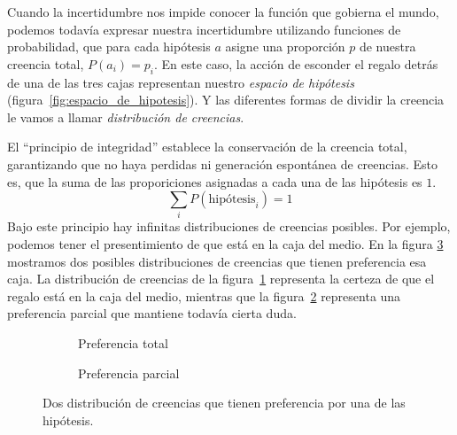 \documentclass[a4paper,10pt]{book}
\theoremstyle{definition}
\begin{document}
%
Cuando la incertidumbre nos impide conocer la función que gobierna el mundo, podemos todavía expresar nuestra incertidumbre utilizando funciones de probabilidad, que para cada hipótesis $a$ asigne una proporción $p$ de nuestra creencia total, $P(a_i) = p_i$.
%
En este caso, la acción de esconder el regalo detrás de una de las tres cajas representan nuestro \emph{espacio de hipótesis} (figura~\ref{fig:espacio_de_hipotesis}).
%
Y las diferentes formas de dividir la creencia le vamos a llamar \emph{distribución de creencias}.


El ``principio de integridad'' establece la conservación de la creencia total, garantizando que no haya perdidas ni generación espontánea de creencias.
%
Esto es, que la suma de las proporiciones asignadas a cada una de las hipótesis es $1$.
%
\begin{equation}
\sum_{i} P(\text{hipótesis}_i) = 1
\end{equation}
%
Bajo este principio hay infinitas distribuciones de creencias posibles.
%
Por ejemplo, podemos tener el presentimiento de que está en la caja del medio.
%
En la figura \ref{fig:distribucion_de_creencias} mostramos dos posibles distribuciones de creencias que tienen preferencia esa caja.
%
La distribución de creencias de la figura~\ref{fig:preferencia_total} representa la certeza de que el regalo está en la caja del medio, mientras que la figura~\ref{fig:preferencia_parcial} representa una preferencia parcial que mantiene todavía cierta duda.


\begin{figure}[ht!]     
 \centering
 \begin{subfigure}[b]{0.48\textwidth}
 \centering
    \caption{Preferencia total}
    \label{fig:preferencia_total}
 \end{subfigure}
 \begin{subfigure}[b]{0.48\textwidth}
 \centering
    \caption{Preferencia parcial}
    \label{fig:preferencia_parcial}
 \end{subfigure}
\caption{Dos distribución de creencias que tienen preferencia por una de las hipótesis.}
 \label{fig:distribucion_de_creencias}
\end{figure}
\end{document}
